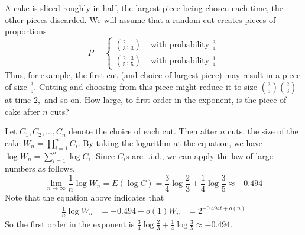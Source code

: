 \begin{exercise}{ A cake is sliced roughly in half, the largest piece being chosen each time, the other pieces discarded. We will assume that a random cut creates pieces of proportions
  $$
  P=\left\{\begin{array}{ll}
  \left(\frac{2}{3}, \frac{1}{3}\right) & \text { with probability } \frac{3}{4} \\
  \left(\frac{2}{5}, \frac{3}{5}\right) & \text { with probability } \frac{1}{4}
  \end{array}\right.
  $$
  Thus, for example, the first cut (and choice of largest piece) may result in a piece of size $\frac{3}{5} .$ Cutting and choosing from this piece might reduce it to size $\left(\frac{3}{5}\right)\left(\frac{2}{3}\right)$ at time $2,$ and so on. How large, to first order in the exponent, is the piece of cake after $n$ cuts?}
  \begin{solution}
  Let $C_1, C_2, \ldots, C_n$ denote the choice of each cut. Then after $n$ cuts, the size of the cake $W_n = \prod_{i=1}^n C_i$. By taking the logarithm at the equation, we have $\log W_n = \sum_{i=1}^n \log C_i$. Since $C_i$s are i.i.d., we can apply the law of large numbers as follows.
  \begin{equation}
    \lim_{n\rightarrow\infty}\frac{1}{n} \log W_n = E(\log C) = \frac{3}{4}\log \frac{2}{3} + \frac{1}{4} \log \frac{3}{5} \approx -0.494
  \end{equation}
  Note that the equation above indicates that
  \begin{equation}
    \begin{aligned}
      \frac{1}{n} \log W_n &= -0.494 + o(1)
      W_n &= 2^{-0.494t +o(n)}
    \end{aligned}
  \end{equation}
  So the first order in the exponent is $\frac{3}{4}\log \frac{2}{3} + \frac{1}{4} \log \frac{3}{5} \approx -0.494$.
  \end{solution}
  \label{ex4-6}
\end{exercise}

